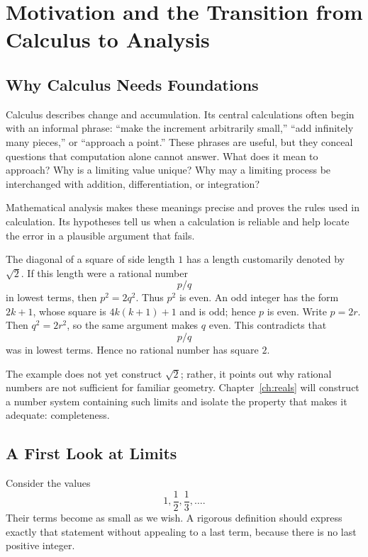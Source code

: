 \chapter{Motivation and the Transition from Calculus to Analysis}
\label{ch:motivation}

\section{Why Calculus Needs Foundations}

Calculus describes change and accumulation. Its central calculations often begin with an informal phrase: ``make the increment arbitrarily small,'' ``add infinitely many pieces,'' or ``approach a point.'' These phrases are useful, but they conceal questions that computation alone cannot answer. What does it mean to approach? Why is a limiting value unique? Why may a limiting process be interchanged with addition, differentiation, or integration?

Mathematical analysis makes these meanings precise and proves the rules used in calculation. Its hypotheses tell us when a calculation is reliable and help locate the error in a plausible argument that fails.

\begin{example}
The diagonal of a square of side length $1$ has a length customarily denoted by $\sqrt{2}$. If this length were a rational number
\[
p/q
\]
 in lowest terms, then $p^2=2q^2$. Thus $p^2$ is even. An odd integer has the form $2k+1$, whose square is $4k(k+1)+1$ and is odd; hence $p$ is even. Write $p=2r$. Then $q^2=2r^2$, so the same argument makes $q$ even. This contradicts that
\[
p/q
\]
 was in lowest terms. Hence no rational number has square $2$.
\end{example}

The example does not yet construct $\sqrt 2$; rather, it points out why rational numbers are not sufficient for familiar geometry. Chapter~\ref{ch:reals} will construct a number system containing such limits and isolate the property that makes it adequate: completeness.

\section{A First Look at Limits}

Consider the values
\[
1,\frac12,\frac13,\ldots.
\]
 Their terms become as small as we wish. A rigorous definition should express exactly that statement without appealing to a last term, because there is no last positive integer.

